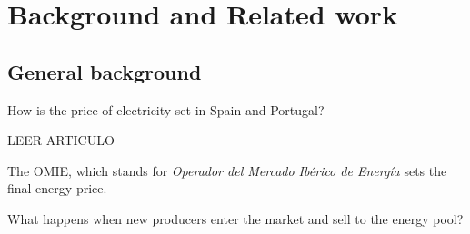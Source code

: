 \documentclass[12pt]{report} %
\begin{document}
\chapter{Background and Related work}



\section{General background}
How is the price of electricity set in Spain and Portugal?

LEER ARTICULO \cite{precio_electricidad_edem}

The OMIE, which stands for \textit{Operador del Mercado Ibérico de Energía} sets the final energy price.


What happens when new producers enter the market and sell to the energy pool?
\end{document}

